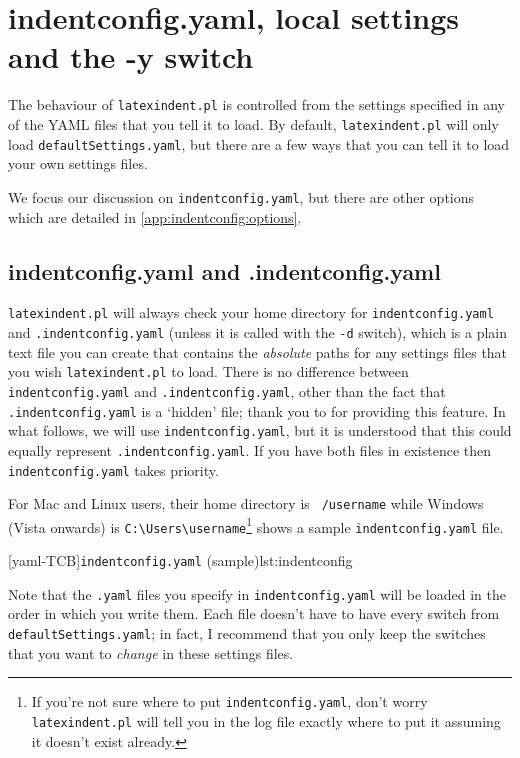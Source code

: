 \section{indentconfig.yaml, local settings and the -y switch }\label{sec:indentconfig}
 The behaviour of \texttt{latexindent.pl} is controlled from the settings specified in
 any of the YAML files that you tell it to load. By default, \texttt{latexindent.pl} will
 only load \texttt{defaultSettings.yaml}, but there are a few ways that you can tell it
 to load your own settings files.

 We focus our discussion on \texttt{indentconfig.yaml}, but there are other options which
 are detailed in \cref{app:indentconfig:options}. 

\subsection{indentconfig.yaml and .indentconfig.yaml}
 \texttt{latexindent.pl} will always check your home directory for
 \texttt{indentconfig.yaml}
 and \texttt{.indentconfig.yaml} (unless it is called with the \texttt{-d} switch), which
 is a plain text file you can create that contains the \emph{absolute} paths for any
 settings files that you wish \texttt{latexindent.pl} to load. There is no difference
 between \texttt{indentconfig.yaml} and \texttt{.indentconfig.yaml}, other than the fact
 that \texttt{.indentconfig.yaml} is a `hidden' file; thank you to
 \cite{jacobo-diaz-hidden-config} for providing this feature. In what follows, we will use
 \texttt{indentconfig.yaml}, but it is understood that this could equally represent
 \texttt{.indentconfig.yaml}. If you have both files in existence then
 \texttt{indentconfig.yaml} takes priority.

 For Mac and Linux users, their home directory is \texttt{~/username} while Windows
 (Vista onwards) is \lstinline!C:\Users\username!\footnote{If you're not sure where to
 put \texttt{indentconfig.yaml}, don't worry \texttt{latexindent.pl} will tell you in the
 log file exactly where to put it assuming it doesn't exist already.}
  shows a sample \texttt{indentconfig.yaml} file.

 [yaml-TCB]{\texttt{indentconfig.yaml} (sample)}{lst:indentconfig}

 Note that the \texttt{.yaml} files you specify in \texttt{indentconfig.yaml} will be
 loaded in the order in which you write them. Each file doesn't have to have every switch
 from \texttt{defaultSettings.yaml}; in fact, I recommend that you only keep the switches
 that you want to \emph{change} in these settings files.


